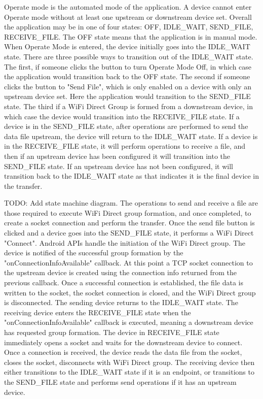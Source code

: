 \documentclass[10pt,twocolumn]{article}
\begin{document}
Operate mode is the automated mode of the application.
A device cannot enter Operate mode without at least one upstream or downstream device set.
Overall the application may be in one of four states: OFF, IDLE\_WAIT, SEND\_FILE, RECEIVE\_FILE.
The OFF state means that the application is in manual mode.
When Operate Mode is entered, the device initially goes into the IDLE\_WAIT state.
There are three possible ways to transition out of the IDLE\_WAIT state.
The first, if someone clicks the button to turn Operate Mode Off, in which case the application would transition back to the OFF state.
The second if someone clicks the button to "Send File", which is only enabled on a device with only an upstream device set.
Here the application would transition to the SEND\_FILE state.
The third if a WiFi Direct Group is formed from a downstream device, in which case the device would transition into the RECEIVE\_FILE state.
If a device is in the SEND\_FILE state, after operations are performed to send the data file upstream, the device will return to the IDLE\_WAIT state.
If a device is in the RECEIVE\_FILE state, it will perform operations to receive a file, and then if an upstream device has been configured it will transition into the SEND\_FILE state.
If an upstream device has not been configured, it will transition back to the IDLE\_WAIT state as that indicates it is the final device in the transfer.

TODO: Add state machine diagram.  
The operations to send and receive a file are those required to execute WiFi Direct group formation, and once completed, to create a socket connection and perform the transfer. 
Once the send file button is clicked and a device goes into the SEND\_FILE state, it performs a WiFi Direct "Connect". 
Android APIs handle the initiation of the WiFi Direct group.
The device is notified of the successful group formation by the "onConnectionInfoAvailable" callback.
At this point a TCP socket connection to the upstream device is created using the connection info returned from the previous callback.
Once a successful connection is established, the file data is written to the socket, the socket connection is closed, and the WiFi Direct group is disconnected.
The sending device returns to the IDLE\_WAIT state.
The receiving device enters the RECEIVE\_FILE state when the "onConnectionInfoAvailable" callback is executed, meaning a downstream device has requested group formation.
The device in RECEIVE\_FILE state immediately opens a socket and waits for the downstream device to connect.
Once a connection is received, the device reads the data file from the socket, closes the socket, disconnects with WiFi Direct group.
The receiving device then either transitions to the IDLE\_WAIT state if it is an endpoint, or transitions to the SEND\_FILE state and performs send operations if it has an upstream device.
\end{document}
